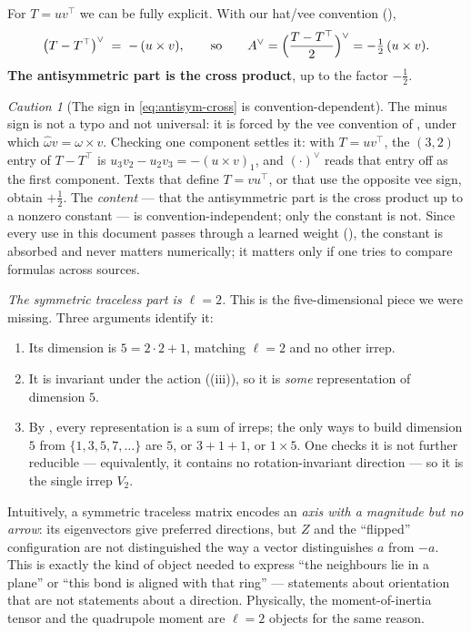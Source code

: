 \documentclass[11pt,a4paper]{report}
\theoremstyle{definition}
\theoremstyle{remark}
\newtheorem{caution}[caution]{Caution}
\begin{document}
For $T=uv^\top$ we can be fully explicit. With our hat/vee convention
(),
\begin{equation}
\label{eq:antisym-cross}
\bigl(T-T^\top\bigr)^\vee \;=\; -\,(u\times v) ,
\qquad\text{so}\qquad
A^\vee=\Bigl(\frac{T-T^\top}{2}\Bigr)^\vee = -\tfrac12\,(u\times v) .
\end{equation}
\textbf{The antisymmetric part is the cross product}, up to the factor
$-\tfrac12$.

\begin{caution}[The sign in \eqref{eq:antisym-cross} is convention-dependent]
\label{caution:antisym-sign}
The minus sign is not a typo and not universal: it is forced by the vee
convention of , under which
$\widehat\omega v=\omega\times v$. Checking one component settles it: with
$T=uv^\top$, the $(3,2)$ entry of $T-T^\top$ is $u_3v_2-u_2v_3=-(u\times v)_1$,
and $(\cdot)^\vee$ reads that entry off as the first component. Texts that
define $T=vu^\top$, or that use the opposite vee sign, obtain $+\tfrac12$.
The \emph{content} --- that the antisymmetric part is the cross product up
to a nonzero constant --- is convention-independent; only the constant is
not. Since every use in this document passes through a learned weight
(), the constant is absorbed and never matters
numerically; it matters only if one tries to compare formulas across
sources.
\end{caution}

\emph{The symmetric traceless part is $\ell=2$.} This is the five-dimensional
piece we were missing. Three arguments identify it:
\begin{enumerate}[nosep,label=(\alph*)]
\item Its dimension is $5=2\cdot2+1$, matching $\ell=2$ and no other irrep.
\item It is invariant under the action ((iii)),
so it is \emph{some} representation of dimension $5$.
\item By , every representation is a sum
of irreps; the only ways to build dimension $5$ from
$\{1,3,5,7,\dots\}$ are $5$, or $3+1+1$, or $1{\times}5$. One checks it is
not further reducible --- equivalently, it contains no rotation-invariant
direction --- so it is the single irrep $V_2$.
\end{enumerate}
Intuitively, a symmetric traceless matrix encodes an \emph{axis with a
magnitude but no arrow}: its eigenvectors give preferred directions, but
$Z$ and the ``flipped'' configuration are not distinguished the way a vector
distinguishes $a$ from $-a$. This is exactly the kind of object needed to
express ``the neighbours lie in a plane'' or ``this bond is aligned with
that ring'' --- statements about orientation that are not statements about a
direction. Physically, the moment-of-inertia tensor and the quadrupole
moment are $\ell=2$ objects for the same reason.
\end{document}
